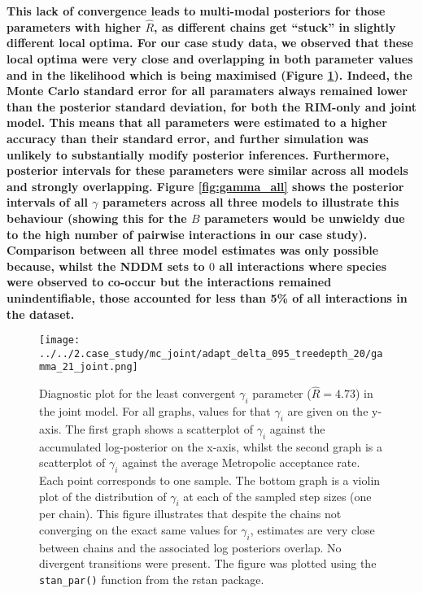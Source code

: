 \begin{refsection}
    \textbf{This lack of convergence leads to multi-modal posteriors for those parameters with higher $\hat{R}$, as different chains get ``stuck'' in slightly different local optima. For our case study data, we observed that these local optima were very close and overlapping in both parameter values and in the likelihood which is being maximised (Figure \ref{fig:parexample}). Indeed, the Monte Carlo standard error for all paramaters always remained lower than the posterior standard deviation, for both the RIM-only and joint model. This means that all parameters were estimated to a higher accuracy than their standard error, and further simulation was unlikely to substantially modify posterior inferences. Furthermore, posterior intervals for these parameters were similar across all models and strongly overlapping. Figure \ref{fig:gamma_all} shows the posterior intervals of all $\gamma$ parameters across all three models to illustrate this behaviour (showing this for the $B$ parameters would be unwieldy due to the high number of pairwise interactions in our case study). Comparison between all three model estimates was only possible because, whilst the NDDM sets to $0$ all interactions where species were observed to co-occur but the interactions remained unindentifiable, those accounted for less than 5\% of all interactions in the dataset.}


    \begin{figure}[H]
        \texttt{[image: ../../2.case\_study/mc\_joint/adapt\_delta\_095\_treedepth\_20/gamma\_21\_joint.png]}
        \caption{Diagnostic plot for the least convergent $\gamma_i$ parameter ($\hat{R} = 4.73$) in the joint model. For all graphs, values for that $\gamma_i$ are given on the y-axis. The first graph shows a scatterplot of $\gamma_i$ against the accumulated log-posterior on the x-axis, whilst the second graph is a scatterplot of $\gamma_i$ against the average Metropolic acceptance rate. Each point corresponds to one sample. The bottom graph is a violin plot of the distribution of $\gamma_i$ at each of the sampled step sizes (one per chain). This figure illustrates that despite the chains not converging on the exact same values for $\gamma_i$, estimates are very close between chains and the associated log posteriors overlap. No divergent transitions were present. The figure was plotted using the \texttt{stan\_par()} function from the rstan package.}
        \label{fig:parexample}
    \end{figure}


\end{refsection}
